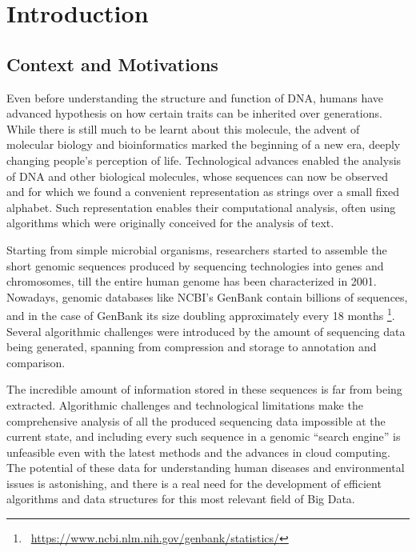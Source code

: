 
\chapter{Introduction}
\label{Chapter1}

\section{Context and Motivations}

Even before understanding the structure and function of DNA, humans have advanced hypothesis on how certain traits can be inherited over generations. While there is still much to be learnt about this molecule, the advent of molecular biology and bioinformatics marked the beginning of a new era, deeply changing people's perception of life. Technological advances enabled the analysis of DNA and other biological molecules, whose sequences can now be observed and for which we found a convenient representation as strings over a small fixed alphabet. Such representation enables their computational analysis, often using algorithms which were originally conceived for the analysis of text.

Starting from simple microbial organisms, researchers started to assemble the short genomic sequences produced by sequencing technologies into genes and chromosomes, till the entire human genome has been characterized in 2001. Nowadays, genomic databases like NCBI's GenBank contain billions of sequences, and in the case of GenBank its size doubling approximately every 18 months \footnote{~\url{https://www.ncbi.nlm.nih.gov/genbank/statistics/}}. Several algorithmic challenges were introduced by the amount of sequencing data being generated, spanning from compression and storage to annotation and comparison.

The incredible amount of information stored in these sequences is far from being extracted. Algorithmic challenges and technological limitations make the comprehensive analysis of all the produced sequencing data impossible at the current state, and including every such sequence in a genomic ``search engine'' is unfeasible even with the latest methods and the advances in cloud computing. The potential of these data for understanding human diseases and environmental issues is astonishing, and there is a real need for the development of efficient algorithms and data structures for this most relevant field of Big Data.

